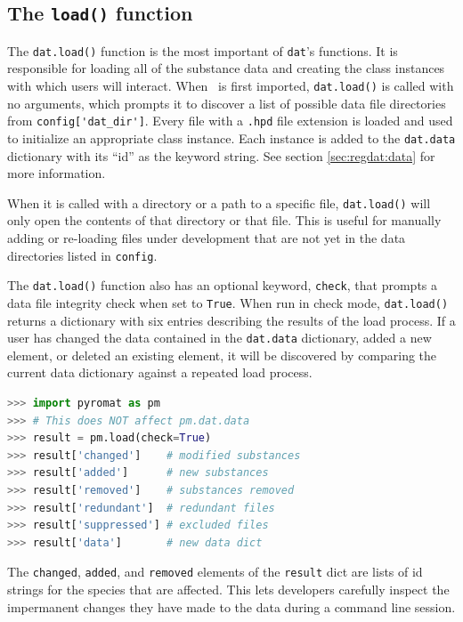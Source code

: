 \subsection{The \texttt{load()} function}\label{sec:regdat:load}

The \texttt{dat.load()} function is the most important of \texttt{dat}'s functions.  It is responsible for loading all of the substance data and creating the class instances with which users will interact.  When \PM\ is first imported, \texttt{dat.load()} is called with no arguments, which prompts it to discover a list of possible data file directories from \verb|config['dat_dir']|.  Every file with a \texttt{.hpd} file extension is loaded and used to initialize an appropriate class instance.  Each instance is added to the \texttt{dat.data} dictionary with its ``id'' as the keyword string.  See section \ref{sec:regdat:data} for more information.

When it is called with a directory or a path to a specific file, \texttt{dat.load()} will only open the contents of that directory or that file.  This is useful for manually adding or re-loading files under development that are not yet in the data directories listed in \texttt{config}.

The \texttt{dat.load()} function also has an optional keyword, \texttt{check}, that prompts a data file integrity check when set to \texttt{True}.  When run in check mode, \texttt{dat.load()} returns a dictionary with six entries describing the results of the load process.  If a user has changed the data contained in the \texttt{dat.data} dictionary, added a new element, or deleted an existing element, it will be discovered by comparing the current data dictionary against a repeated load process.
\begin{lstlisting}[language=Python]
>>> import pyromat as pm
>>> # This does NOT affect pm.dat.data
>>> result = pm.load(check=True)
>>> result['changed']    # modified substances
>>> result['added']      # new substances
>>> result['removed']    # substances removed 
>>> result['redundant']  # redundant files
>>> result['suppressed'] # excluded files
>>> result['data']       # new data dict
\end{lstlisting}

The \texttt{changed}, \texttt{added}, and \texttt{removed} elements of the \texttt{result} dict are lists of id strings for the species that are affected.  This lets developers carefully inspect the impermanent changes they have made to the data during a command line session.

